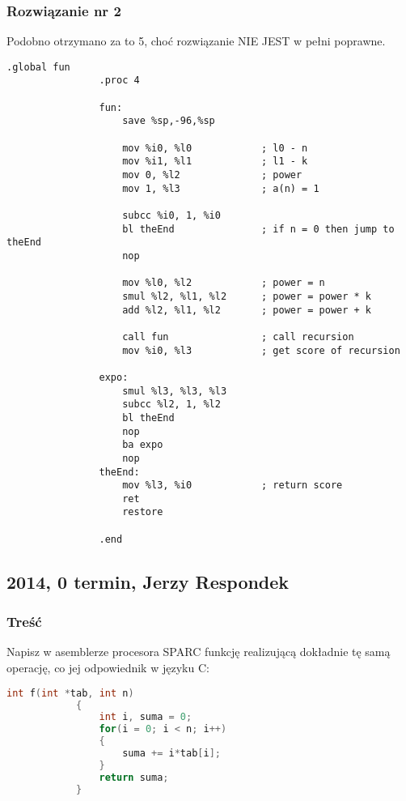 		\subsubsection{Rozwiązanie nr 2}
			Podobno otrzymano za to 5, choć rozwiązanie NIE JEST w pełni poprawne.
			\begin{lstlisting}[language={[sparc]Assembler}]
				.global fun
				.proc 4
				
				fun:
					save %sp,-96,%sp
				
					mov %i0, %l0			; l0 - n
					mov %i1, %l1			; l1 - k
					mov 0, %l2				; power
					mov 1, %l3				; a(n) = 1
				
					subcc %i0, 1, %i0
					bl theEnd				; if n = 0 then jump to theEnd
					nop
					
					mov %l0, %l2			; power = n
					smul %l2, %l1, %l2		; power = power * k
					add %l2, %l1, %l2		; power = power + k
				
					call fun				; call recursion
					mov %i0, %l3			; get score of recursion
				
				expo:
					smul %l3, %l3, %l3
					subcc %l2, 1, %l2
					bl theEnd
					nop
					ba expo
					nop
				theEnd:
					mov %l3, %i0			; return score
					ret
					restore
				
				.end
			\end{lstlisting}
		
	\newpage
	\subsection{2014, 0 termin, Jerzy Respondek}
		\subsubsection{Treść}
			Napisz w asemblerze procesora SPARC funkcję realizującą dokładnie tę samą operację, co jej odpowiednik w języku C:
			\begin{lstlisting}[language=C]
			int f(int *tab, int n) 
			{
				int i, suma = 0;
				for(i = 0; i < n; i++)
				{
					suma += i*tab[i];
				}
				return suma;
			}
			\end{lstlisting}
